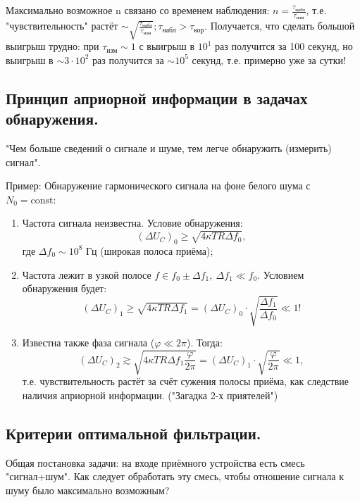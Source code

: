 \documentclass[../main/main.tex]{subfiles}
\begin{document}
Максимально возможное n связано со временем наблюдения: $n = \frac{\tau_{\text{набл}}}{\tau_{\text{изм}}}$, т.е. "чувствительность"{} растёт $\sim \sqrt{\frac{\tau_{\text{набл}}}{\tau_{\text{изм}}}}; \tau_{\text{набл}} > \tau_{\text{кор}}.$
Получается, что сделать большой выигрыш трудно: при $\tau_{\text{изм}} \sim 1$ с выигрыш в $10^1$ раз получится за 100 секунд, но выигрыш в $\sim 3 \cdot 10^2$ раз получится за $\sim 10^5$ секунд, т.е. примерно уже за сутки! 

\subsection{Принцип априорной информации в задачах обнаружения.}

"Чем больше сведений о сигнале и шуме, тем легче обнаружить (измерить) сигнал".

Пример: Обнаружение гармонического сигнала на фоне белого шума с $N_0 = \text{const}$:

\begin{enumerate}
    \item Частота сигнала неизвестна. Условие обнаружения: $$(\Delta U_C)_0 \geqslant \sqrt{4 \kappa T R \Delta f_0},$$ где $\Delta f_0 \sim 10^8$ Гц (широкая полоса приёма);
    
    \item Частота лежит в узкой полосе $f \in f_0 \pm \Delta f_1,~ \Delta f_1 \ll f_0$. Условием обнаружения будет: $$(\Delta U_C)_1 \geqslant \sqrt{4 \kappa T R \Delta f_1} = (\Delta U_C)_0 \cdot \sqrt{\frac{\Delta f_1}{\Delta f_0}} \ll 1!$$
    
    \item Известна также фаза сигнала ($\varphi \ll 2\pi$). Тогда: $$(\Delta U_C)_2 \gtrsim \sqrt{4 \kappa T R \Delta f_1 \frac{\varphi}{2\pi}} = (\Delta U_C)_1 \cdot \sqrt{\frac{\varphi}{2\pi}} \ll 1,$$
    т.е. чувствительность растёт за счёт сужения полосы приёма, как следствие наличия априорной информации. ("Загадка 2-х приятелей")
\end{enumerate}

\subsection{Критерии оптимальной фильтрации.}

Общая постановка задачи: на входе приёмного устройства есть смесь "сигнал+шум". Как следует обработать эту смесь, чтобы отношение сигнала к шуму было максимально возможным?
\end{document}
